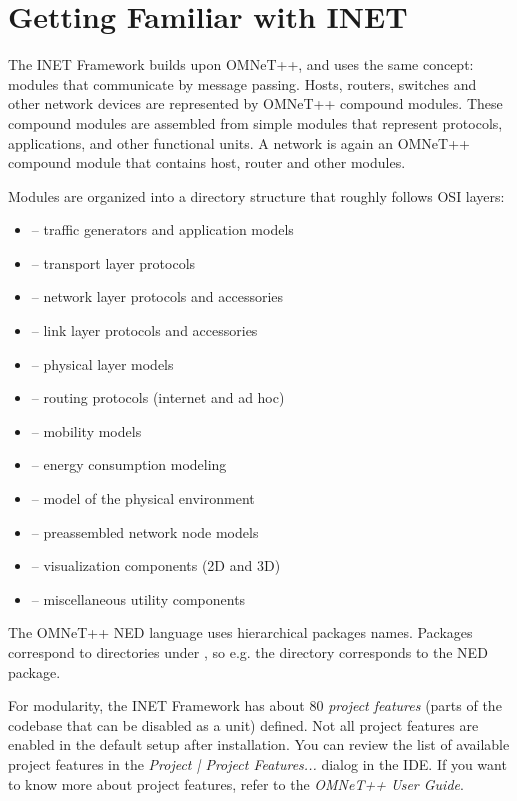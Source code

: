 \section{Getting Familiar with INET}
\label{sec:usage:getting-familiar-with-inet}

The INET Framework builds upon OMNeT++, and uses the same concept: modules
that communicate by message passing. Hosts, routers, switches and other
network devices are represented by OMNeT++ compound modules. These compound
modules are assembled from simple modules that represent protocols,
applications, and other functional units. A network is again an OMNeT++
compound module that contains host, router and other modules.

Modules are organized into a directory structure that roughly follows
OSI layers:

\begin{itemize}
  \item {} -- traffic generators and application models
  \item {} -- transport layer protocols
  \item {} -- network layer protocols and accessories
  \item {} -- link layer protocols and accessories
  \item {} -- physical layer models
  \item {} -- routing protocols (internet and ad hoc)
  \item {} -- mobility models
  \item {} -- energy consumption modeling
  \item {} -- model of the physical environment
  \item {} -- preassembled network node models
  \item {} -- visualization components (2D and 3D)
  \item {} -- miscellaneous utility components
\end{itemize}

The OMNeT++ NED language uses hierarchical packages names. Packages correspond
to directories under , so e.g. the 
directory corresponds to the  NED package.

For modularity, the INET Framework has about 80 \textit{project features}
(parts of the codebase that can be disabled as a unit) defined. Not all project
features are enabled in the default setup after installation. You can review
the list of available project features in the \emph{Project | Project Features...}
dialog in the IDE. If you want to know more about project features, refer to the
\emph{OMNeT++ User Guide}.



